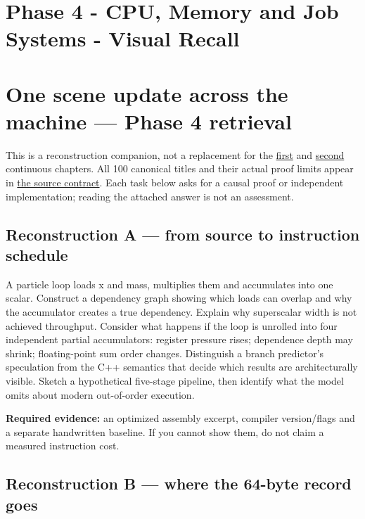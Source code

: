 \hypertarget{appendix-2587680a4fe3}{}
\section*{Phase 4 - CPU, Memory and Job Systems - Visual Recall}
\section{One scene update across the machine --- Phase 4 retrieval}\label{appendix-2587680a4fe3-one-scene-update-across-the-machine-phase-4-retrieval}

This is a reconstruction companion, not a replacement for the \hyperref[01-foundations-i-ch007-from-a-correct-c-asset-service-to-the-instructions-a-cpu-can-execute-phase-4-m019m021-parts-301346]{first} and \hyperref[01-foundations-i-ch007-from-temporary-memory-to-finished-parallel-frames-phase-4-m022m024-parts-347400]{second} continuous chapters. All 100 canonical titles and their actual proof limits appear in \hyperref[appendix-fd090d982a15-phase-4-cpu-architecture-and-measured-execution-parts-301400]{the source contract}. Each task below asks for a causal proof or independent implementation; reading the attached answer is not an assessment.

\subsection{Reconstruction A --- from source to instruction schedule}\label{appendix-2587680a4fe3-reconstruction-a-from-source-to-instruction-schedule}

A particle loop loads x and mass, multiplies them and accumulates into one scalar. Construct a dependency graph showing which loads can overlap and why the accumulator creates a true dependency. Explain why superscalar width is not achieved throughput. Consider what happens if the loop is unrolled into four independent partial accumulators: register pressure rises; dependence depth may shrink; floating-point sum order changes. Distinguish a branch predictor's speculation from the C++ semantics that decide which results are architecturally visible. Sketch a hypothetical five-stage pipeline, then identify what the model omits about modern out-of-order execution.

\textbf{Required evidence:} an optimized assembly excerpt, compiler version/flags and a separate handwritten baseline. If you cannot show them, do not claim a measured instruction cost.

\subsection{Reconstruction B --- where the 64-byte record goes}\label{appendix-2587680a4fe3-reconstruction-b-where-the-64-byte-record-goes}

